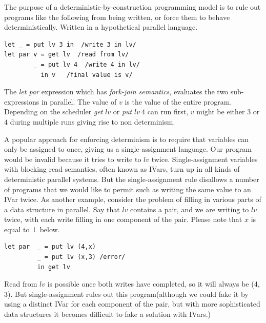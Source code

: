 \documentclass[twocolumn]{article}
\begin{document}
The purpose of a deterministic-by-construction programming model is to rule out programs like the following from being written, or force them to behave deterministically. \cite{lindsey}Written in a hypothetical parallel language. 
\begin{verbatim}
let _ = put lv 3 in  /write 3 in lv/
let par v = get lv  /read from lv/
        _ = put lv 4  /write 4 in lv/
	      in v   /final value is v/
\end{verbatim} 
The \textit{let par} expression which has \textit{fork-join semantics}, evaluates the two sub-expressions in parallel. The value of $v$ is the value of the entire program. Depending on the scheduler \textit{get} $lv$ or \textit{put} $lv\ 4$ can run first, $v$ might be either $3$ or $4$ during multiple runs giving rise to non determinism.\par
A popular approach for enforcing determinism is to require that variables can only be assigned to once, giving us a single-assignment language. Our program would be invalid because it tries to write to $lv$ twice. Single-assignment variables with blocking read semantics, often known as IVars, turn up in all kinds of deterministic parallel systems. But the single-assignment rule disallows a number of programs that we would like to permit such as writing the same value to an IVar twice. As another example, consider the problem of filling in various parts of a data structure in parallel. \cite{lindsey}Say that $lv$ contains a pair, and we are writing to $lv$ twice, with each write filling in one component of the pair. Please note that $x$ is equal to $\bot$ below.\par 
\begin{verbatim}
let par  _ = put lv (4,x)
         _ = put lv (x,3) /error/
         in get lv
\end{verbatim}  
Read from $lv$ is possible once both writes have completed, so it will always be (4, 3). But single-assignment rules out this program(although we could fake it by using a distinct IVar for each component of the pair, but with more sophisticated data structures it becomes difficult to fake a solution with IVars.)\par
\end{document}
